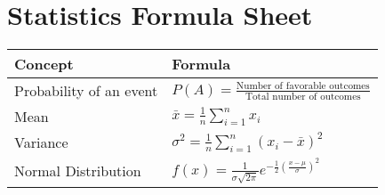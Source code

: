 \documentclass{article}
\begin{document}
\section*{Statistics Formula Sheet}

\begin{tabular}{|l|l|}
\hline
\textbf{Concept} & \textbf{Formula} \\
\hline
Probability of an event & 
$
P(A) = \frac{\text{Number of favorable outcomes}}{\text{Total number of outcomes}}
$ \\
\hline
Mean & 
$
\bar{x} = \frac{1}{n} \sum_{i=1}^{n} x_i
$ \\
\hline
Variance & 
$
\sigma^2 = \frac{1}{n} \sum_{i=1}^{n} (x_i - \bar{x})^2
$ \\
\hline
Normal Distribution & 
$
f(x) = \frac{1}{\sigma \sqrt{2\pi}} e^{-\frac{1}{2} \left(\frac{x-\mu}{\sigma} \right)^2}
$ \\
\hline
\end{tabular}
\end{document}
